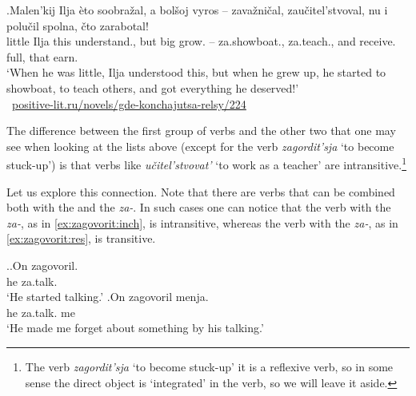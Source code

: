 \exg.\label{ex:zateach}Malen'kij Ilja \`{e}to soobra\v{z}al, a bol\v{s}oj vyros -- zava\v{z}ni\v{c}al, zau\v{c}itel'stvoval, {nu i} polu\v{c}il spolna, \v{c}to zarabotal!\\
little Ilja this understand., but big grow. -- za.showboat., za.teach., {and} receive. full, that earn.\\
\trans `When he was little, Ilja understood this, but when he grew up, he started to showboat, to teach others, and got everything he deserved!'\\\hbox{}\hfill\hbox{
\url{positive-lit.ru/novels/gde-konchajutsa-relsy/224}}

The difference between the first group of verbs and the other two that one may see when looking at the lists above (except for the verb \textit{zagordit'sja} `to become stuck-up') is that verbs like \textit{u\v{c}itel'stvovat'} `to work as a teacher' are intransitive.\footnote{The verb \textit{zagordit'sja} `to become stuck-up' it is a reflexive verb, so in some sense the direct object is `integrated' in the verb, so we will leave it aside.}

Let us explore this connection. Note that there are verbs that can be combined both with the  and the  \textit{za-}. In such cases one can notice that the verb with the  \textit{za-}, as in \ref{ex:zagovorit:inch}, is intransitive, whereas the verb with the  \textit{za-}, as in \ref{ex:zagovorit:res}, is transitive.

\ex.\ag.\label{ex:zagovorit:inch}On zagovoril.\\
he za.talk.\\
\trans `He started talking.'
\bg.\label{ex:zagovorit:res}On zagovoril menja.\\
he za.talk. me\\
\trans `He made me forget about something by his talking.'
 
